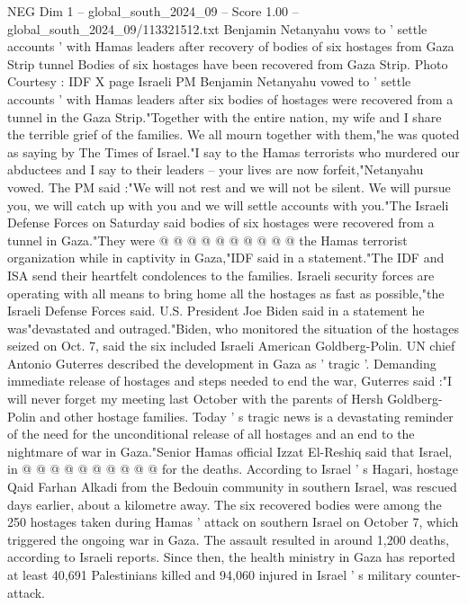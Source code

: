 \begin{textsample}{NEG Dim 1 – global\_south\_2024\_09 – Score 1.00 – global\_south\_2024\_09/113321512.txt}  \label{ex:f1_neg_420}
Benjamin Netanyahu vows to ' settle accounts ' with Hamas leaders after recovery of bodies of six hostages from Gaza Strip tunnel Bodies of six hostages have been recovered from Gaza Strip.
Photo Courtesy : IDF X page Israeli PM Benjamin Netanyahu vowed to ' settle accounts ' with Hamas leaders after six bodies of hostages were recovered from a tunnel in the Gaza Strip."Together with the entire nation, my wife and I share the terrible grief of the families.
We all mourn together with them,"he was quoted as saying by The Times of Israel."I say to the Hamas terrorists who murdered our abductees and I say to their leaders -- your lives are now forfeit,"Netanyahu vowed.
The PM said :"We will not rest and we will not be silent.
We will pursue you, we will catch up with you and we will settle accounts with you."The Israeli Defense Forces on Saturday said bodies of six hostages were recovered from a tunnel in Gaza."They were @ @ @ @ @ @ @ @ @ @ the Hamas terrorist organization while in captivity in Gaza,"IDF said in a statement."The IDF and ISA send their heartfelt condolences to the families.
Israeli security forces are operating with all means to bring home all the hostages as fast as possible,"the Israeli Defense Forces said.
U.S.
President Joe Biden said in a statement he was"devastated and outraged."Biden, who monitored the situation of the hostages seized on Oct. 7, said the six included Israeli American Goldberg-Polin.
UN chief Antonio Guterres described the development in Gaza as ' tragic '.
Demanding immediate release of hostages and steps needed to end the war, Guterres said :"I will never forget my meeting last October with the parents of Hersh Goldberg-Polin and other hostage families.
Today ' s tragic news is a devastating reminder of the need for the unconditional release of all hostages and an end to the nightmare of war in Gaza."Senior Hamas official Izzat El-Reshiq said that Israel, in @ @ @ @ @ @ @ @ @ @ for the deaths.
According to Israel ' s Hagari, hostage Qaid Farhan Alkadi from the Bedouin community in southern Israel, was rescued days earlier, about a kilometre away.
The six recovered bodies were among the 250 hostages taken during Hamas ' attack on southern Israel on October 7, which triggered the ongoing war in Gaza.
The assault resulted in around 1,200 deaths, according to Israeli reports.
Since then, the health ministry in Gaza has reported at least 40,691 Palestinians killed and 94,060 injured in Israel ' s military counter-attack.

\end{textsample}
